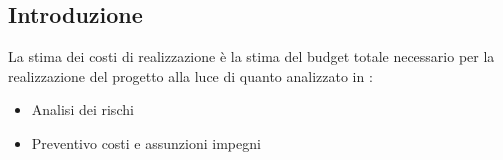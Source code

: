 \subsection{Introduzione}
La stima dei costi di realizzazione è la stima del budget totale necessario per la realizzazione del progetto alla luce di quanto analizzato in : 
\begin{itemize}
    \item Analisi dei rischi
    \item Preventivo costi e assunzioni impegni
\end{itemize}
